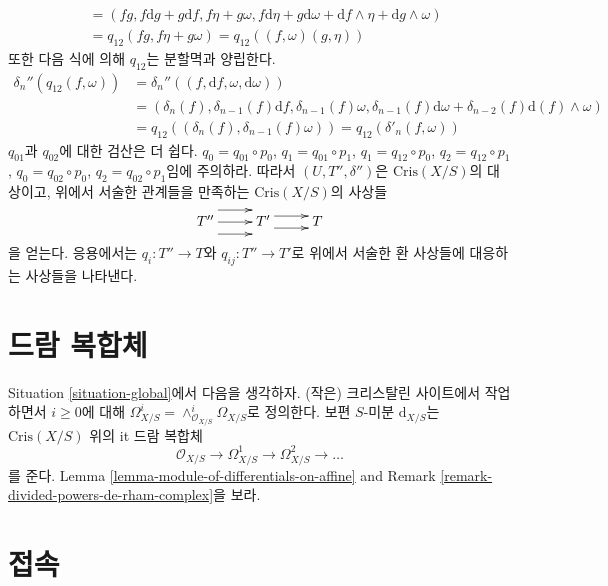 \begin{remark}
\begin{align*}
& =
(fg, f\text{d}g + g \text{d}f, f\eta + g\omega,
f\text{d}\eta + g\text{d}\omega + \text{d}f \wedge \eta +
\text{d}g \wedge \omega) \\
& = q_{12}(fg, f\eta + g\omega) = q_{12}((f, \omega)(g, \eta))
\end{align*}
또한 다음 식에 의해 $q_{12}$는 분할멱과 양립한다.
\begin{align*}
\delta_n''(q_{12}(f, \omega)) & =
\delta_n''((f, \text{d}f, \omega, \text{d}\omega)) \\
& =
(\delta_n(f), \delta_{n - 1}(f)\text{d}f, \delta_{n - 1}(f)\omega,
\delta_{n - 1}(f)\text{d}\omega + \delta_{n - 2}(f)\text{d}(f) \wedge \omega)
\\
& = q_{12}((\delta_n(f), \delta_{n - 1}(f)\omega)) =
q_{12}(\delta'_n(f, \omega))
\end{align*}
$q_{01}$과 $q_{02}$에 대한 검산은 더 쉽다.
$q_0 = q_{01} \circ p_0$, $q_1 = q_{01} \circ p_1$,
$q_1 = q_{12} \circ p_0$, $q_2 = q_{12} \circ p_1$,
$q_0 = q_{02} \circ p_0$, $q_2 = q_{02} \circ p_1$임에 주의하라.
따라서 $(U, T'', \delta'')$은 $\text{Cris}(X/S)$의 대상이고,
위에서 서술한 관계들을 만족하는 $\text{Cris}(X/S)$의 사상들
$$
\xymatrix{
T''
\ar@<2ex>[r]
\ar@<0ex>[r]
\ar@<-2ex>[r]
&
T'
\ar@<1ex>[r]
\ar@<-1ex>[r]
&
T
}
$$
을 얻는다. 응용에서는 $q_i : T'' \to T$와
$q_{ij} : T'' \to T'$로 위에서 서술한 환 사상들에 대응하는
사상들을 나타낸다.
\end{remark}






\section{드람 복합체}
\label{section-de-Rham}

\noindent
Situation \ref{situation-global}에서 다음을 생각하자.
(작은) 크리스탈린 사이트에서 작업하면서 $i \geq 0$에 대해
$\Omega^i_{X/S} = \wedge^i_{\mathcal{O}_{X/S}} \Omega_{X/S}$로
정의한다. 보편 $S$-미분 $\text{d}_{X/S}$는
$\text{Cris}(X/S)$ 위의 {it 드람 복합체}
$$
\mathcal{O}_{X/S} \to \Omega^1_{X/S} \to \Omega^2_{X/S} \to \ldots
$$
를 준다. Lemma \ref{lemma-module-of-differentials-on-affine} and
Remark \ref{remark-divided-powers-de-rham-complex}을 보라.


\section{접속}
\label{section-connections}

